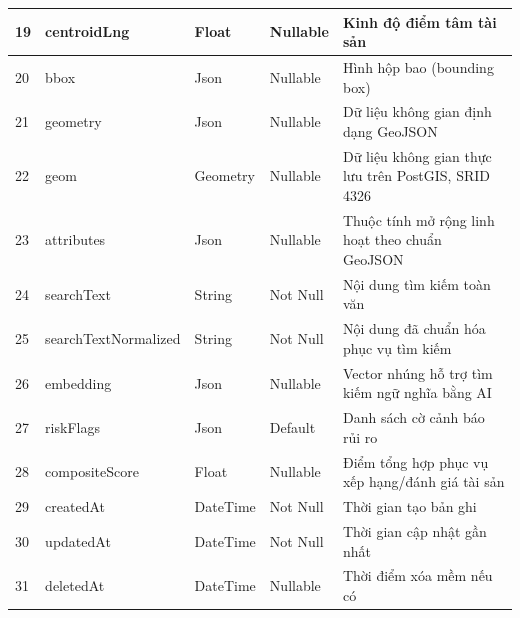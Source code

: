 \begin{longtable}{|p{0.7cm}|p{3.3cm}|p{1.9cm}|p{2.1cm}|p{5.4cm}|}
    19 & centroidLng & Float & Nullable & Kinh độ điểm tâm tài sản \\ \hline
    20 & bbox & Json & Nullable & Hình hộp bao (bounding box) \\ \hline
    21 & geometry & Json & Nullable & Dữ liệu không gian định dạng GeoJSON \\ \hline
    22 & geom & Geometry & Nullable & Dữ liệu không gian thực lưu trên PostGIS, SRID 4326 \\ \hline
    23 & attributes & Json & Nullable & Thuộc tính mở rộng linh hoạt theo chuẩn GeoJSON \\ \hline
    24 & searchText & String & Not Null & Nội dung tìm kiếm toàn văn \\ \hline
    25 & search\-Text\-Normalized & String & Not Null & Nội dung đã chuẩn hóa phục vụ tìm kiếm \\ \hline
    26 & embedding & Json & Nullable & Vector nhúng hỗ trợ tìm kiếm ngữ nghĩa bằng AI \\ \hline
    27 & riskFlags & Json & Default & Danh sách cờ cảnh báo rủi ro \\ \hline
    28 & compositeScore & Float & Nullable & Điểm tổng hợp phục vụ xếp hạng/đánh giá tài sản \\ \hline
    29 & createdAt & DateTime & Not Null & Thời gian tạo bản ghi \\ \hline
    30 & updatedAt & DateTime & Not Null & Thời gian cập nhật gần nhất \\ \hline
    31 & deletedAt & DateTime & Nullable & Thời điểm xóa mềm nếu có \\
\end{longtable}
